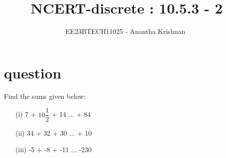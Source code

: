 \documentclass[journal,12pt,twocolumn]{IEEEtran}
\theoremstyle{remark}
\begin{document}

\vspace{3cm}

\title{NCERT-discrete : 10.5.3 - 2}
\author{EE23BTECH11025 - Anantha Krishnan $^{}$%
}
\maketitle
\newpage
\bigskip



\section{question}
\vspace{0.5cm}
Find the sums given below:
\begin{enumerate}
    \item[(i)] 7 + $10\dfrac{1}{2}$ + 14 ... + 84
    \item[(ii)] 34 + 32 + 30 ... + 10
    \item[(iii)] -5 + -8 + -11 ... -230

\end{enumerate}
\end{document}
